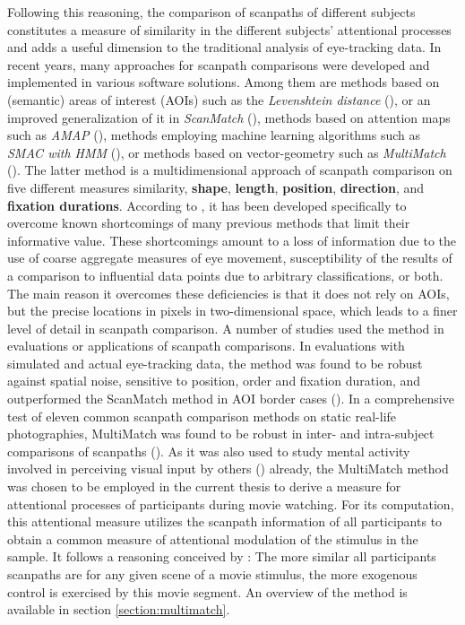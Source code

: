 \documentclass[a4paper, 12pt]{scrreprt}
\begin{document}
Following this reasoning, the comparison of scanpaths of different subjects constitutes a measure of similarity in the different subjects’ attentional processes and adds a useful dimension to the traditional analysis of eye-tracking data. \newline
In recent years, many approaches for scanpath comparisons were developed and implemented in various software solutions. Among them are methods based on (semantic) areas of interest (AOIs) such as the \textit{Levenshtein distance} (\cite{levenshtein1966binary}), or an improved generalization of it in \textit{ScanMatch} (\cite{cristino2010scanmatch}), methods based on attention maps such as \textit{AMAP} (\cite{ouerhani2004empirical}), methods employing machine learning algorithms such as \textit{SMAC with HMM} (\cite{coutrot2018scanpath}), or methods based on vector-geometry such as \textit{MultiMatch} (\cite{jarodzka2010vector}). The latter method is a multidimensional approach of scanpath comparison on five different measures similarity, \textbf{shape}, \textbf{length}, \textbf{position}, \textbf{direction}, and \textbf{fixation durations}. According to \textcite{jarodzka2010vector}, it has been developed specifically to overcome known shortcomings of many previous methods that limit their informative value. These shortcomings amount to a loss of information due to the use of coarse aggregate measures of eye movement, susceptibility of the results of a comparison to influential data points due to arbitrary classifications, or both. The main reason it overcomes these deficiencies is that it does not rely on AOIs, but the precise locations in pixels in two-dimensional space, which leads to a finer level of detail in scanpath comparison. \newline A number of studies used the method in evaluations or applications of scanpath comparisons. In evaluations with simulated and actual eye-tracking data, the method was found to be robust against spatial noise, sensitive to position, order and fixation duration, and outperformed the ScanMatch method in AOI border cases (\cite{dewhurst2012depends}). In a comprehensive test of eleven common scanpath comparison methods on static real-life photographies, MultiMatch was found to be robust in inter- and intra-subject comparisons of scanpaths (\cite{anderson2015comparison}). As it was also used to study mental activity involved in perceiving visual input by others (\cite{french2017evaluation}) already, the MultiMatch method was chosen to be employed in the current thesis to derive a measure for attentional processes of participants during movie watching. \newline
For its computation, this attentional measure utilizes the scanpath information of all participants to obtain a common measure of attentional modulation of the stimulus in the sample. It follows a reasoning conceived by \textcite{baumgartner}: The more similar all participants scanpaths are for any given scene of a movie stimulus, the more exogenous control is exercised by this movie segment.
An overview of the method is available in section \ref{section:multimatch}.
 
\end{document}
